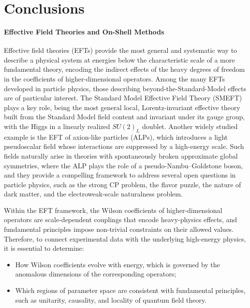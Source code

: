 \chapter{Conclusions}

\subsubsection*{Effective Field Theories and On-Shell Methods}

Effective field theories (EFTs) provide the most general and systematic way to describe a physical
system at energies below the characteristic scale of a more fundamental theory, encoding the
indirect effects of the heavy degrees of freedom in the coefficients of higher-dimensional
operators. Among the many EFTs developed in particle physics, those describing
beyond-the-Standard-Model effects are of particular interest. The Standard Model Effective Field
Theory (SMEFT) plays a key role, being the most general local, Lorentz-invariant effective theory
built from the Standard Model field content and invariant under its gauge group, with the Higgs in a
linearly realized $SU(2)_L$ doublet. Another widely studied example is the EFT of axion-like
particles (ALPs), which introduces a light pseudoscalar field whose interactions are suppressed by a
high-energy scale. Such fields naturally arise in theories with spontaneously broken approximate
global symmetries, where the ALP plays the role of a pseudo-Nambu--Goldstone boson, and they provide
a compelling framework to address several open questions in particle physics, such as the strong CP
problem, the flavor puzzle, the nature of dark matter, and the electroweak-scale naturalness
problem.

Within the EFT framework, the Wilson coefficients of higher-dimensional operators are
scale-dependent couplings that encode heavy-physics effects, and fundamental principles impose
non-trivial constraints on their allowed values. Therefore, to connect experimental data with the
underlying high-energy physics, it is essential to determine:
\begin{itemize}
    \item How Wilson coefficients evolve with energy, which is governed by the anomalous dimensions
    of the corresponding operators;
    \item Which regions of parameter space are consistent with fundamental principles, such as
    unitarity, causality, and locality of quantum field theory.
\end{itemize}

